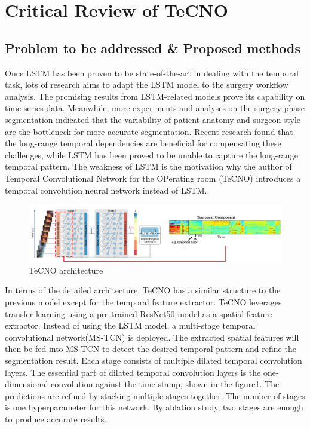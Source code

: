 \documentclass[11pt]{article} \usepackage[top=1in, bottom=1in, left=1in, right=1in]{geometry}
\begin{document}
\section{Critical Review of TeCNO}
\subsection{Problem to be addressed \& Proposed methods}
Once LSTM has been proven to be state-of-the-art in dealing with the temporal task, lots of research aims to adapt the LSTM model to the surgery workflow analysis. The promising results from LSTM-related models prove its capability on time-series data. Meanwhile, more experiments and analyses on the surgery phase segmentation indicated that the variability of patient anatomy and surgeon style are the bottleneck for more accurate segmentation. Recent research found that the long-range temporal dependencies are beneficial for compensating these challenges, while LSTM has been proved to be unable to capture the long-range temporal pattern. The weakness of LSTM  is the motivation why the author of Temporal Convolutional Network for the OPerating room (TeCNO) introduces a temporal convolution neural network instead of LSTM. 

\begin{figure}[H]
  \includegraphics[width=\textwidth]{TeCNO_arch.png}
  \centering
  \caption{ TeCNO architecture \cite{TeCNO}}
  \label{fig:tecno_arch}
\end{figure}

In terms of the detailed architecture, TeCNO has a similar structure to the previous model except for the temporal feature extractor. TeCNO leverages transfer learning using a pre-trained ResNet50 model as a spatial feature extractor. Instead of using the LSTM model, a multi-stage temporal convolutional network(MS-TCN) is deployed. The extracted spatial features will then be fed into MS-TCN to detect the desired temporal pattern and refine the segmentation result. Each stage consists of multiple dilated temporal convolution layers. The essential part of dilated temporal convolution layers is the one-dimensional convolution against the time stamp, shown in the figure\ref{fig:tecno_arch}. The predictions are refined by stacking multiple stages together. The number of stages is one hyperparameter for this network. By ablation study, two stages are enough to produce accurate results. 
\end{document}
